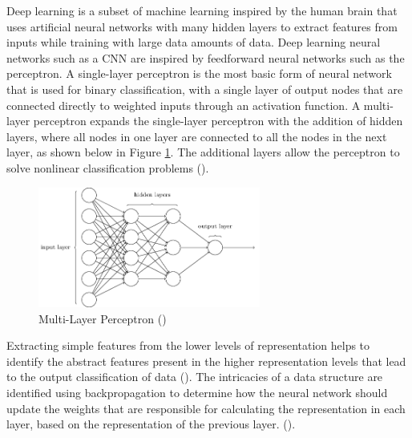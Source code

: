 Deep learning is a subset of machine learning inspired by the human brain that uses artificial neural networks with many hidden layers to extract features from inputs while training with large data amounts of data.
Deep learning neural networks such as a \acrfull{CNN} are inspired by feedforward neural networks such as the perceptron. A single-layer perceptron is the most basic form of neural network that is used for binary classification, with a single layer of output nodes that are connected directly to weighted inputs through an activation function. A multi-layer perceptron expands the single-layer perceptron with the addition of hidden layers, where all nodes in one layer are connected to all the nodes in the next layer, as shown below in Figure \ref{fig:perceptron_multi}. The additional layers allow the perceptron to solve nonlinear classification problems (\cite{driss_comparison_2017}).

\begin{figure}[ht!]
\centering
\includegraphics[width=0.65\textwidth]{media/literature/machine_learning/ml_perceptron_multi.png}
\caption[Diagram of a multi-layer perceptron]{Multi-Layer Perceptron (\cite{michael_perceptron_2019})}
\label{fig:perceptron_multi}
\end{figure}


Extracting simple features from the lower levels of representation helps to identify the abstract features present in the higher representation levels that lead to the output classification of data (\cite{bengio_deep_2011}).
%
The intricacies of a data structure are identified using backpropagation to determine how the neural network should update the weights that are responsible for calculating the representation in each layer, based on the representation of the previous layer. (\cite{lecun_deep_2015}).


